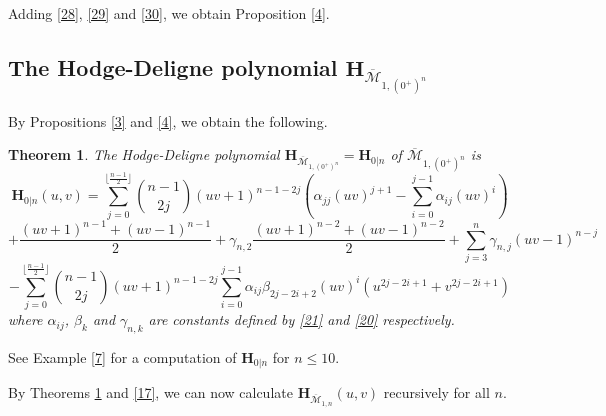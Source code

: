 \documentclass[11pt]{amsart}
\numberwithin{equation}{section}
\newtheorem{theo}{Theorem}[section]
\theoremstyle{definition}
\newcommand{\bH}{\mathbf{H}}
\def\cM{{\mathcal M}}
\def\bcM{\overline{\cM}}
\begin{document}
Adding \eqref{28}, \eqref{29} and \eqref{30}, we obtain Proposition \ref{4}. 
 
\medskip

\subsection{The Hodge-Deligne polynomial $\bH_{\bcM_{1,(0^+)^n}}$} 

By Propositions \ref{3} and \ref{4}, we obtain the following.
\begin{theo}\label{22}
The Hodge-Deligne polynomial $\bH_{\bcM_{1,(0^+)^n}}=\bH_{0|n}$ of $\bcM_{1,(0^+)^n}$ is 
\[ \bH_{0|n}(u,v)= \sum_{j=0}^{\lfloor\frac{n-1}{2}\rfloor} \binom{n-1}{2j} (uv+1)^{n-1-2j} \left( \alpha_{jj}(uv)^{j+1} - \sum_{i=0}^{j-1} \alpha_{ij}(uv)^i\right)
\]
\[ +\frac{(uv+1)^{n-1}+(uv-1)^{n-1}}{2} + \gamma_{n,2} \frac{(uv+1)^{n-2}+(uv-1)^{n-2}}{2} + \sum_{j=3}^n \gamma_{n,j} (uv-1)^{n-j} \]
\[ -\sum_{j=0}^{\lfloor\frac{n-1}{2}\rfloor} \binom{n-1}{2j} (uv+1)^{n-1-2j}  \sum_{i=0}^{j-1} \alpha_{ij}\beta_{2j-2i+2}(uv)^i(u^{2j-2i+1}+v^{2j-2i+1}) \]
where $\alpha_{ij}$, $\beta_k$ and $\gamma_{n,k}$ are constants defined by \eqref{21} and \eqref{20} respectively. 
\end{theo}


See Example \ref{7} for a computation of $\bH_{0|n}$ for $n\le 10$.

By Theorems \ref{22} and \ref{17}, we can now calculate $\bH_{\bcM_{1,n}}(u,v)$ recursively for all $n$.









\end{document}
